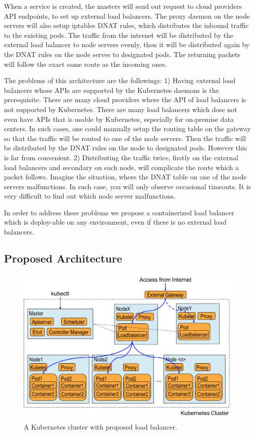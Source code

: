 When a service is created, the masters will send out request to cloud providers API endpoints, 
to set up external load balancers.
The proxy daemon on the node servers will also setup iptables DNAT\cite{MartinA.Brown2017} rules, 
which distributes the inbound traffic to the existing pods.
The traffic from the internet will be distributed by the external load balancer to node servers evenly, 
then it will be distributed again by the DNAT rules on the node serves to designated pods. 
The returning packets will follow the exact same route as the incoming ones.

The problems of this architecture are the followings: 
1) Having external load balancers whose APIs are supported by the Kubernetes daemons is the prerequisite. 
There are many cloud providers where the API of load balancers is not supported by Kubernetes. 
There are many load balancers which dose not even have APIs that is usable by Kubernetes, 
especially for on-premise data centers.  
In such cases, one could manually setup the routing table on the gateway so that the traffic will be routed to one of the node servers.
Then the traffic will be distributed by the DNAT rules on the node to designated pods.
However this is far from convenient.
2) Distributing the traffic twice, firstly on the external load balancers and secondary on each node, 
will complicate the route which a packet follows. 
Imagine the situation, where the DNAT table on one of the node servers malfunctions.
In such case, you will only observe occasional timeouts. It is very difficult to find out which node server malfunctions.   

In order to address these problems we propose a containerized load balancer 
which is deploy-able on any environment, even if there is no external load balancers.

\subsection{Proposed Architecture}

\begin{figure}
\includegraphics[width=\columnwidth]{Figs/K8sProposed}
\caption{A Kubernetes cluster with proposed load balancer.}
\label{fig:K8sProposed}
\end{figure}

